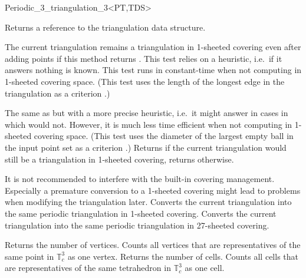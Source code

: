 \begin{ccRefClass}{Periodic_3_triangulation_3<PT,TDS>}
\begin{ccAdvanced}
{Returns a reference to the triangulation data structure.}

{The current triangulation remains a triangulation in 1-sheeted
  covering even after adding points if this method returns
  . This test relies on a heuristic, i.e.\ if it answers
   nothing is known. This test runs in constant-time when
  not computing in 1-sheeted covering space. (This test uses the length
of the longest edge in the triangulation as a
criterion \cite{cgal:ct-c3pt-09}.)}

{The same as  but with
a more precise heuristic, i.e.\ it might answer  in cases in which
 would not. However, it is
much less time efficient when not computing in 1-sheeted covering
space. (This test uses the diameter of the largest empty ball in the
input point set as a criterion \cite{cgal:ct-c3pt-09}.)}
\ccGlue
{}
{Returns  if the current triangulation would still be a
  triangulation in 1-sheeted covering, returns  otherwise.}

It is not recommended to interfere with the built-in covering
management. Especially a premature conversion to a 1-sheeted covering
might lead to problems when modifying the triangulation later.
{Converts the current triangulation into the same periodic
  triangulation in 1-sheeted covering.}
\ccGlue
{}
{Converts the current triangulation into the same periodic
  triangulation in 27-sheeted covering.}

\end{ccAdvanced}


{Returns the number of vertices. Counts all vertices that are
  representatives of the same point in $\mathbb T_c^3$ as one vertex.}
\ccGlue
{}
{Returns the number of cells. Counts all cells that are
  representatives of the same tetrahedron in $\mathbb T_c^3$ as one
  cell.}


\end{ccRefClass}
